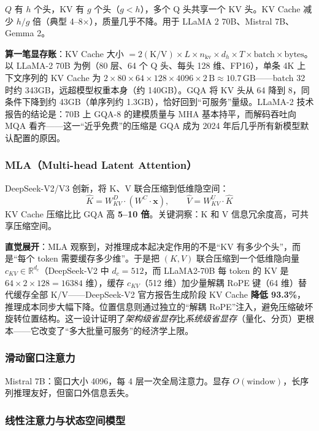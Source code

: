 \documentclass[12pt,a4paper]{article}
\begin{document}
$Q$ 有 $h$ 个头，KV 有 $g$ 个头（$g < h$），多个 Q 头共享一个 KV 头。KV Cache 减少 $h/g$ 倍（典型 4--8$\times$），质量几乎不降。用于 LLaMA 2 70B、Mistral 7B、Gemma 2。

\textbf{算一笔显存账}：KV Cache 大小 $= 2(\text{K/V}) \times L \times n_{\text{kv}} \times d_h \times T \times \text{batch} \times \text{bytes}$。以 LLaMA-2 70B 为例（80 层、64 个 Q 头、每头 128 维、FP16），单条 4K 上下文序列的 KV Cache 为 $2 \times 80 \times 64 \times 128 \times 4096 \times 2\,\text{B} \approx 10.7\,\text{GB}$——batch 32 时约 343GB，远超模型权重本身（约 140GB）。GQA 将 KV 头从 64 降到 8，同条件下降到约 43GB（单序列约 1.3GB），恰好回到“可服务”量级。LLaMA-2 技术报告的结论是：70B 上 GQA-8 的建模质量与 MHA 基本持平，而解码吞吐向 MQA 看齐——这一“近乎免费”的压缩是 GQA 成为 2024 年后几乎所有新模型默认配置的原因。

\subsubsection{MLA（Multi-head Latent Attention）}

DeepSeek-V2/V3 创新，将 K、V 联合压缩到低维隐空间：
\[
\hat{K} = W_{KV}^D \cdot (W^C \cdot \mathbf{x}), \qquad
\hat{V} = W_{KV}^U \cdot \hat{K}
\]
KV Cache 压缩比比 GQA 高 \textbf{5--10 倍}。关键洞察：K 和 V 信息冗余度高，可共享压缩空间。

\textbf{直觉展开}：MLA 观察到，对推理成本起决定作用的不是“KV 有多少个头”，而是“每个 token 需要缓存多少维”。于是把 $(K, V)$ 联合压缩到一个低维隐向量 $c_{KV} \in \mathbb{R}^{d_c}$（DeepSeek-V2 中 $d_c=512$，而 LLaMA2-70B 每 token 的 KV 是 $64 \times 2 \times 128 = 16384$ 维），缓存 $c_{KV}$（512 维）加少量解耦 RoPE 键（64 维）替代缓存全部 K/V——DeepSeek-V2 官方报告生成阶段 KV Cache \textbf{降低 93.3\%}，推理成本同步大幅下降。位置信息则通过独立的“解耦 RoPE”注入，避免压缩破坏旋转位置结构。这一设计证明了\emph{架构级省显存}比\emph{系统级省显存}（量化、分页）更根本——它改变了“多大批量可服务”的经济学上限。

\subsubsection{滑动窗口注意力}

Mistral 7B：窗口大小 4096，每 4 层一次全局注意力。显存 $O(\text{window})$，长序列推理友好，但窗口外信息丢失。

\subsubsection{线性注意力与状态空间模型}
\end{document}
